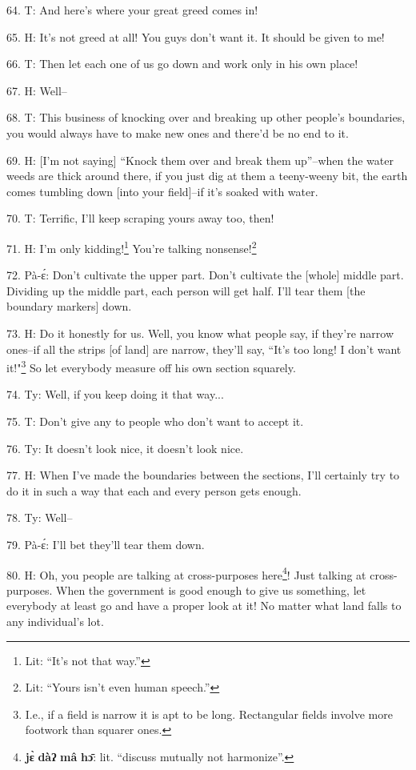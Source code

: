 64. T: And here's where your great greed comes in!

65. H: It's not greed at all! You guys don't want it. It should be given to me!

66. T: Then let each one of us go down and work only in his own place!

67. H: Well--

68. T: This business of knocking over and breaking up other people's boundaries,
you would always have to make new ones and there'd be no end to it.

69. H: [I'm not saying] ``Knock them over and break them up''--when the
water weeds are thick around there, if you just dig at them a teeny-weeny bit,
the earth comes tumbling down [into your field]--if it's soaked with water.

70. T: Terrific, I'll keep scraping yours away too, then!

71. H:  I'm only kidding!\footnote{Lit: ``It's not that way.''} You're talking nonsense!\footnote{Lit: ``Yours isn't even human speech.''}

72. Pà-ɛ́: Don't cultivate the upper part. Don't cultivate the [whole] middle
part. Dividing up the middle part, each person will get half. I'll tear them [the
boundary markers] down.

73. H: Do it honestly for us. Well, you know what people say, if they're narrow
ones--if all the strips [of land] are narrow, they'll say, ``It's too long!
I don't want it!"\footnote{I.e., if a field is narrow it is apt to be long. Rectangular fields involve more footwork than squarer ones.} So let everybody measure off his own section squarely.

74. Ty: Well, if you keep doing it that way...

75. T: Don't give any to people who don't want to accept it.

76. Ty: It doesn't look nice, it doesn't look nice.

77. H: When I've made the boundaries between the sections, I'll certainly try to
do it in such a way that each and every person gets enough.

78. Ty: Well--

79. Pà-ɛ́: I'll bet they'll tear them down.

80. H: Oh, you people are talking at cross-purposes here\footnote{\textbf{jɛ̀} \textbf{dàʔ} \textbf{mâ} \textbf{hɔ̄}: lit. ``discuss mutually not harmonize''.}! Just talking at cross-purposes.
When the government is good enough to give us something, let everybody at least
go and have a proper look at it! No matter what land falls to any individual's
lot.

